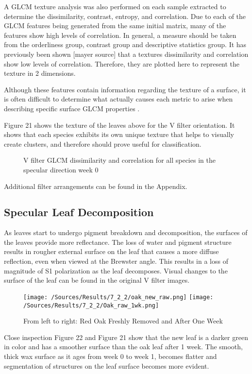A GLCM texture analysis was also performed on each sample extracted to determine the dissimilarity, contrast, entropy, and correlation. Due to each of the GLCM features being generated from the same initial matrix, many of the features show high levels of correlation.  In general, a measure should be taken from the orderliness group, contrast group and descriptive statistics group. It has previously been shown [mayer source] that a textures dissimilarity and correlation show low levels of correlation.  Therefore, they are plotted here to represent the texture in 2 dimensions.

Although these features contain information regarding the texture of a surface, it is often difficult to determine what actually causes each metric to arise when describing specific surface GLCM properties \cite{haralick}.

Figure 21 shows the texture of the leaves above for the V filter orientation.  It shows that each species exhibits its own unique texture that helps to visually create clusters, and therefore should prove useful for classification.
%
\begin{figure}[!htb]
    \begin{center}
    \end{center}
    \caption{V filter GLCM dissimilarity and correlation for all species in the specular direction week 0}
    \label{fig:polarization}
\end{figure}
%
Additional filter arrangements can be found in the Appendix.

\subsection{Specular Leaf Decomposition}
As leaves start to undergo pigment breakdown and decomposition, the surfaces of the leaves provide more reflectance.  The loss of water and pigment structure results in rougher external surface on the leaf that causes a more diffuse reflection, even when viewed at the Brewster angle.  This results in a loss of magnitude of S1 polarization as the leaf decomposes.  Visual changes to the surface of the leaf can be found in the original V filter images.
%
\begin{figure}[htp]
    \centering
    \hspace*{\fill}%
    \texttt{[image: /Sources/Results/7\_2\_2/oak\_new\_raw.png]}\hfill%
    \texttt{[image: /Sources/Results/7\_2\_2/Oak\_raw\_1wk.png]}
    \hspace*{\fill}%
    \caption{From left to right: Red Oak Freshly Removed and After One Week}
    \label{fig:specular-raw-decompose}
\end{figure}
%
Close inspection Figure 22 and Figure 21 show that the new leaf is a darker green in color and has a smoother surface than the oak leaf after 1 week.  The smooth, thick wax surface as it ages from week 0 to week 1, becomes flatter and segmentation of structures on the leaf surface becomes more evident.

